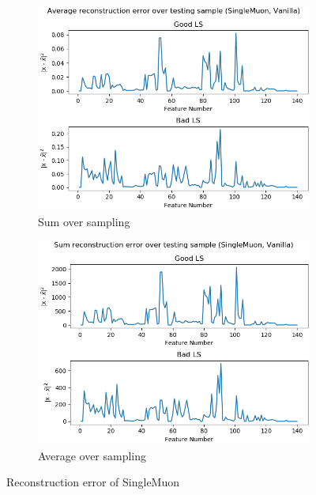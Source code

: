 \begin{figure}[h!]
\centering
    \begin{subfigure}[b]{0.49\linewidth}
        \includegraphics[width=\linewidth]{images/reco/2018/feature_2/avg_sd_Vanilla_SingleMuon_f2_1.png}
        \caption{Sum over sampling}
    \end{subfigure}
    \begin{subfigure}[b]{0.49\linewidth}
        \includegraphics[width=\linewidth]{images/reco/2018/feature_2/sum_sd_Vanilla_SingleMuon_f2_1.png}
        \caption{Average over sampling}
    \end{subfigure}
    \caption{Reconstruction error of SingleMuon}
\label{fig:2018_recon_error_singlemuon}
\end{figure}

